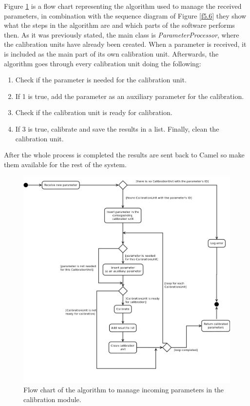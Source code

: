 Figure \ref{f5.5} is a flow chart representing the algorithm used to manage the received parameters, in combination with the sequence diagram of Figure \ref{f5.6} they show what the steps in the algorithm are and which parts of the software performs then. As it was previously stated, the main class is \emph{ParameterProcessor}, where the calibration units have already been created. When a parameter is received, it is included as the main part of its own calibration unit. Afterwards, the algorithm goes through every calibration unit doing the following:
\begin{enumerate}
\item Check if the parameter is needed for the calibration unit.
\item If 1 is true, add the parameter as an auxiliary parameter for the calibration.
\item Check if the calibration unit is ready for calibration.
\item If 3 is true, calibrate and save the results in a list. Finally, clean the calibration unit.
\end{enumerate}

After the whole process is completed the results are sent back to Camel so make them available for the rest of the system.

\begin{figure}[H]
\centerline{\includegraphics[width=1.2\textwidth]{images/ReceiveParameterAndCalibrateFlowChart.png}}
\caption{Flow chart of the algorithm to manage incoming parameters in the calibration module.}
\label{f5.5}
\end{figure}


